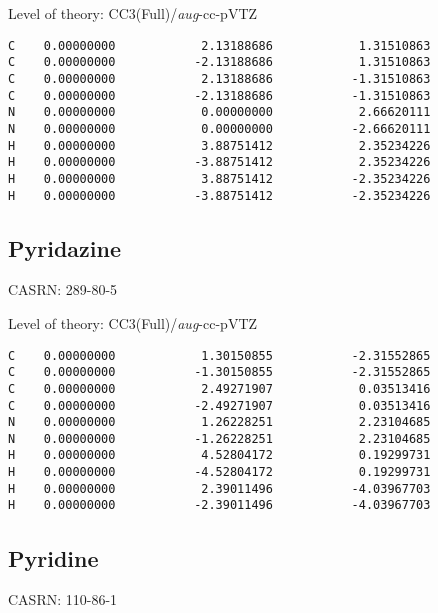 \documentclass[journal=jctcce,manuscript=article,layout=traditional]{achemso}
\newcommand{\AVTZ}{\emph{aug}-cc-pVTZ}
\begin{document}
\begin{singlespace}
\noindent Level of theory: CC3(Full)/{\AVTZ}
\begin{verbatim}
C    0.00000000            2.13188686            1.31510863   
C    0.00000000           -2.13188686            1.31510863   
C    0.00000000            2.13188686           -1.31510863   
C    0.00000000           -2.13188686           -1.31510863  
N    0.00000000            0.00000000            2.66620111    
N    0.00000000            0.00000000           -2.66620111    
H    0.00000000            3.88751412            2.35234226   
H    0.00000000           -3.88751412            2.35234226   
H    0.00000000            3.88751412           -2.35234226   
H    0.00000000           -3.88751412           -2.35234226  
\end{verbatim}
\end{singlespace}

\subsection{Pyridazine}

CASRN: 289-80-5

\begin{singlespace}
\noindent Level of theory: CC3(Full)/{\AVTZ}
\begin{verbatim}
C    0.00000000            1.30150855           -2.31552865
C    0.00000000           -1.30150855           -2.31552865
C    0.00000000            2.49271907            0.03513416
C    0.00000000           -2.49271907            0.03513416
N    0.00000000            1.26228251            2.23104685
N    0.00000000           -1.26228251            2.23104685
H    0.00000000            4.52804172            0.19299731
H    0.00000000           -4.52804172            0.19299731
H    0.00000000            2.39011496           -4.03967703
H    0.00000000           -2.39011496           -4.03967703
\end{verbatim}
\end{singlespace}

\subsection{Pyridine}

CASRN: 110-86-1
\end{document}
